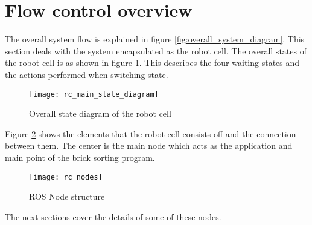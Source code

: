 \section{Flow control overview}
\label{sec:rc_flow_control}
The overall system flow is explained in figure \ref{fig:overall_system_diagram}. This section deals with the system encapsulated as the robot cell. The overall states of the  robot cell is as shown in figure \ref{fig:rc_main_state}. This describes the four waiting states and the actions performed when switching state.
	
	\begin{figure}[H]
		\centering
	    \texttt{[image: rc\_main\_state\_diagram]}
	    \caption{Overall state diagram of the robot cell}
		\label{fig:rc_main_state}
	\end{figure}
	
Figure \ref{fig:rc_nodes} shows the elements that the robot cell consists off and the connection between them. The center is the main node which acts as the application and main point of the brick sorting program. 

	\begin{figure}[H]
		\centering
	    \texttt{[image: rc\_nodes]}
	    \caption{ROS Node structure}
		\label{fig:rc_nodes}
	\end{figure}
	
The next sections cover the details of some of these nodes.
	
